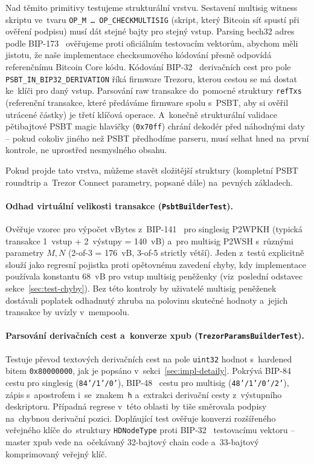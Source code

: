Nad těmito primitivy testujeme strukturální vrstvu. Sestavení
multisig witness skriptu ve~tvaru
\texttt{OP\_M~\ldots~OP\_CHECKMULTISIG} (skript, který Bitcoin
síť spustí při ověření podpisu) musí dát stejné bajty pro stejný
vstup. Parsing bech32 adres podle BIP-173~\cite{BIP173} ověřujeme
proti oficiálním testovacím vektorům, abychom měli jistotu, že naše
implementace check\-sumového kódování přesně odpovídá referenčnímu
Bitcoin Core kódu. Kódování BIP-32~\cite{BIP32} derivačních cest pro
pole \texttt{PSBT\_\allowbreak IN\_\allowbreak BIP32\_\allowbreak DERIVATION}
říká firmware Trezoru, kterou cestou se má dostat ke~klíči pro daný
vstup. Parsování raw transakce do~pomocné struktury \texttt{refTxs}
(referenční transakce, které předáváme firmware spolu s~PSBT, aby si
ověřil utrácené částky) je třetí klíčová operace. A~konečně
strukturální validace pětibajtové PSBT magic hlavičky
(\texttt{0x70\allowbreak ff})
chrání dekodér před náhodnými daty -- pokud cokoliv jiného než PSBT
předhodíme parseru, musí selhat hned na~první kontrole, ne uprostřed
nesmyslného obsahu.

Pokud projde tato vrstva, můžeme stavět složitější struktury
(kompletní PSBT roundtrip a~Trezor Connect parametry, popsané dále)
na~pevných základech.

\paragraph{Odhad virtuální velikosti transakce
(\texttt{PsbtBuilderTest}).}
Ověřuje vzorec pro výpočet vBytes z~BIP-141~\cite{BIP141} pro singlesig
P2WPKH (typická transakce 1~vstup + 2~výstupy = 140~vB) a~pro multisig
P2WSH s~různými parametry $M, N$ (2-of-3 = 176~vB, 3-of-5 strictly větší).
Jeden z~testů explicitně slouží jako regresní pojistka proti opětovnému
zavedení chyby, kdy implementace používala konstantu 68~vB pro vstup
multisig peněženky (viz~poslední odstavec sekce~\ref{sec:test-chyby}).
Bez této kontroly by uživatelé multisig peněženek dostávali poplatek
odhadnutý zhruba na polovinu skutečné hodnoty a~jejich transakce
by uvízly v~mempoolu.

\paragraph{Parsování derivačních cest a~konverze xpub
(\texttt{TrezorParamsBuilderTest}).}
Testuje převod textových derivačních cest na pole \texttt{uint32} hodnot
s~hardened bitem \texttt{0x80000000}, jak je popsáno
v~sekci~\ref{sec:impl-detaily}. Pokrývá BIP-84~\cite{BIP84} cestu pro
singlesig (\texttt{84'/1'/0'}), BIP-48~\cite{BIP48} cestu pro multisig
(\texttt{48'/1'/0'/2'}), zápis s~apostrofem i~se~znakem~\texttt{h}
a~extrakci derivační cesty z~výstupního deskriptoru. Případná regrese
v~této oblasti by tiše směrovala podpisy na~chybnou derivační pozici.
Doplňující test ověřuje konverzi rozšířeného veřejného klíče
do~struktury \texttt{HDNodeType} proti BIP-32~\cite{BIP32} testovacímu
vektoru -- master xpub vede na~očekávaný 32-bajtový chain code
a~33-bajtový komprimovaný veřejný klíč.

